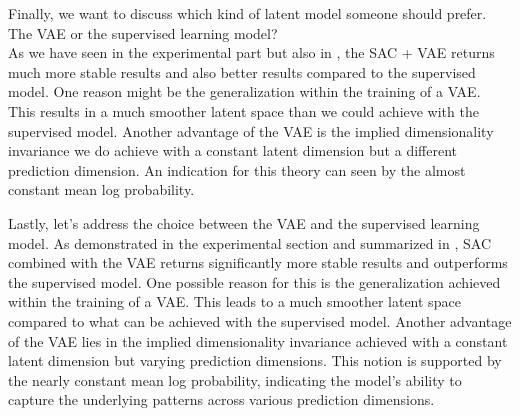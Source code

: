 

Finally, we want to discuss which kind of latent model someone should prefer. The VAE or the supervised learning model? \\
As we have seen in the experimental part but also in , the SAC + VAE returns much more stable results and also better results compared to the supervised model. One reason might be the generalization within the training of a VAE. This results in a much smoother latent space than we could achieve with the supervised model. Another advantage of the VAE is the implied dimensionality invariance we do achieve with a constant latent dimension but a different prediction dimension. An indication for this theory can seen by the almost constant mean log probability. 


Lastly, let's address the choice between the VAE and the supervised learning model. As demonstrated in the experimental section and summarized in , SAC combined with the VAE returns significantly more stable results and outperforms the supervised model. One possible reason for this is the generalization achieved within the training of a VAE. This leads to a much smoother latent space compared to what can be achieved with the supervised model. Another advantage of the VAE lies in the implied dimensionality invariance achieved with a constant latent dimension but varying prediction dimensions. This notion is supported by the nearly constant mean log probability, indicating the model's ability to capture the underlying patterns across various prediction dimensions.



